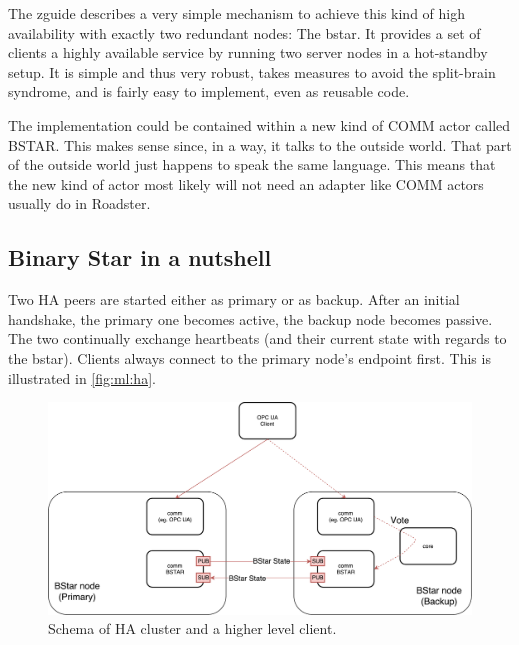 The \gls{zguide} describes a very simple mechanism to achieve this kind of high
availability with exactly two redundant nodes: The \gls{bstar}. It
provides a set of clients a highly available service by running two server
nodes in a hot-standby setup. It is simple and thus very robust, takes measures to avoid the
split-brain syndrome, and is fairly easy to implement, even as reusable
code.

The implementation could be contained within a new kind of COMM actor
called BSTAR. This makes sense since, in a way, it talks to the outside world.
That part of the outside world just happens to speak the same language. This
means that the new kind of actor most likely will not need an adapter like COMM
actors usually do in Roadster.

\subsection{Binary Star in a nutshell}
Two HA peers are started either as primary or as backup. After an initial
handshake, the primary one becomes active, the backup node becomes passive. The
two continually exchange heartbeats (and their current state with regards to
the \gls{bstar}). Clients always connect to the primary node's endpoint first. This
is illustrated in \autoref{fig:ml:ha}.

\begin{figure}[]
	\includegraphics[width=\textwidth]{img/ML-HA_bstar.pdf}
	\caption{Schema of HA cluster and a higher level client.}
	\label{fig:ml:ha}
\end{figure}

